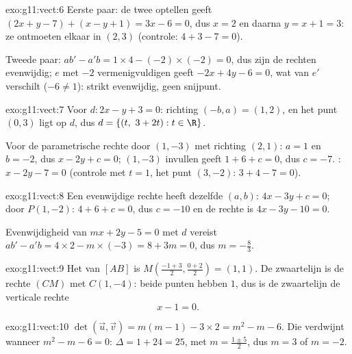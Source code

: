 \begin{solution}{exo:g11:vect:6}
Eerste paar: de twee  optellen geeft
$(2x + y - 7) + (x - y + 1) = 3x - 6 = 0$, dus $x = 2$ en daarna
$y = x + 1 = 3$: ze ontmoeten elkaar in $(2, 3)$ (controle:
$4 + 3 - 7 = 0$).

Tweede paar: $ab' - a'b = 1 \times 4 - (-2) \times (-2) = 0$, dus zijn de
rechten evenwijdig; $e$ met $-2$ vermenigvuldigen geeft
$-2x + 4y - 6 = 0$, wat van $e'$ verschilt ($-6 \neq 1$): strikt
evenwijdig, geen snijpunt.
\end{solution}

\begin{solution}{exo:g11:vect:7}
Voor $d: 2x - y + 3 = 0$: richting $(-b, a) = (1, 2)$, en het punt $(0, 3)$
ligt op $d$, dus $d = \{(t,\ 3 + 2t) : t \in \R\}$.

Voor de parametrische rechte door $(1, -3)$ met richting $(2, 1)$: $a = 1$
en $b = -2$, dus $x - 2y + c = 0$; $(1, -3)$ invullen geeft
$1 + 6 + c = 0$, dus $c = -7$. : $x - 2y - 7 = 0$ (controle met
$t = 1$, het punt $(3, -2)$: $3 + 4 - 7 = 0$).
\end{solution}

\begin{solution}{exo:g11:vect:8}
Een evenwijdige rechte heeft dezelfde $(a, b)$: $4x - 3y + c = 0$; door
$P(1, -2)$: $4 + 6 + c = 0$, dus $c = -10$ en de rechte is
$4x - 3y - 10 = 0$.

Evenwijdigheid van $mx + 2y - 5 = 0$ met $d$ vereist
$ab' - a'b = 4 \times 2 - m \times (-3) = 8 + 3m = 0$, dus
$m = -\frac83$.
\end{solution}

\begin{solution}{exo:g11:vect:9}
Het  van $[AB]$ is $M\!\left(\frac{-1+3}{2}, \frac{0+2}{2}\right) =
(1, 1)$. De zwaartelijn is de rechte $(CM)$ met $C(1, -4)$: beide punten
hebben  $1$, dus is de zwaartelijn de verticale rechte
\[
x - 1 = 0 .
\]
\end{solution}

\begin{solution}{exo:g11:vect:10}
$\det(\vec u, \vec v) = m(m - 1) - 3 \times 2 = m^2 - m - 6$. Die verdwijnt
wanneer $m^2 - m - 6 = 0$: $\Delta = 1 + 24 = 25$, met 
$m = \frac{1 \pm 5}{2}$, dus $m = 3$ of $m = -2$.
\end{solution}


